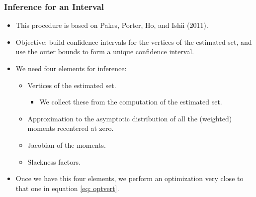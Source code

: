\documentclass[10pt,letterpaper]{beamer}
\begin{document}
\begin{frame}[label=estsetb]
\frametitle{Inference for an Interval}

\begin{itemize}
	\item This procedure is based on Pakes, Porter, Ho, and Ishii (2011).
	\item Objective: build confidence intervals for the vertices of the estimated set, and use the outer bounds to form a unique confidence interval.
	\item We need four elements for inference:
	\begin{itemize}
		\item Vertices of the estimated set.
		\begin{itemize}
			\item We collect these from the computation of the estimated set.
		\end{itemize}
		\item Approximation to the asymptotic distribution of all the (weighted) moments recentered at zero.
		\item Jacobian of the moments.
		\item Slackness factors.
	\end{itemize}
	\item Once we have this four elements, we perform an optimization very close to that one in equation \eqref{eq: optvert}.
\end{itemize}
\hyperlink{estset}{}
\end{frame}
\end{document}
